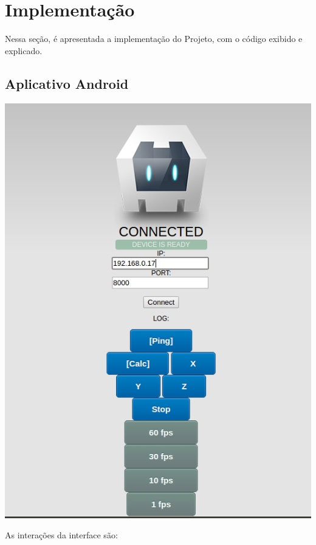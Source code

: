 \documentclass[a4paper,12pt]{article}
\begin{document}
\newpage
\section{Implementação}

Nessa seção, é apresentada a implementação do Projeto, com o código exibido e explicado.


\newpage
\subsection{Aplicativo Android}

\includegraphics[width=1\linewidth]{images/Cordova.png}
\newpage


As interações da interface são:
\end{document}
